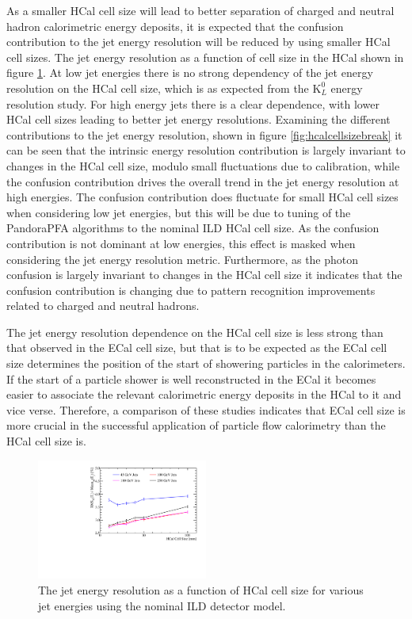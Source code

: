 As a smaller HCal cell size will lead to better separation of charged and neutral hadron calorimetric energy deposits, it is expected that the confusion contribution to the jet energy resolution will be reduced by using smaller HCal cell sizes.  The jet energy resolution as a function of cell size in the HCal shown in figure \ref{fig:hcalcellsize}.  At low jet energies there is no strong dependency of the jet energy resolution on the HCal cell size, which is as expected from the $\text{K}^{0}_{L}$ energy resolution study.  For high energy jets there is a clear dependence, with lower HCal cell sizes leading to better jet energy resolutions.  Examining the different contributions to the jet energy resolution, shown in figure \ref{fig:hcalcellsizebreak} it can be seen that the intrinsic energy resolution contribution is largely invariant to changes in the HCal cell size, modulo small fluctuations due to calibration, while the confusion contribution drives the overall trend in the jet energy resolution at high energies.  The confusion contribution does fluctuate for small HCal cell sizes when considering low jet energies, but this will be due to tuning of the PandoraPFA algorithms to the nominal ILD HCal cell size.  As the confusion contribution is not dominant at low energies, this effect is masked when considering the jet energy resolution metric.  Furthermore, as the photon confusion is largely invariant to changes in the HCal cell size it indicates that the confusion contribution is changing due to pattern recognition improvements related to charged and neutral hadrons.

The jet energy resolution dependence on the HCal cell size is less strong than that observed in the ECal cell size, but that is to be expected as the ECal cell size determines the position of the start of showering particles in the calorimeters.  If the start of a particle shower is well reconstructed in the ECal it becomes easier to associate the relevant calorimetric energy deposits in the HCal to it and vice verse.  Therefore, a comparison of these studies indicates that ECal cell size is more crucial in the successful application of particle flow calorimetry than the HCal cell size is.

\begin{figure}
\centering
\includegraphics[width=0.5\textwidth]{OptimisationStudies/Plots/JetEnergyResolutions/JER_vs_HCalCellSize.pdf}
\caption[The jet energy resolution as a function of HCal cell size for various jet energies using the nominal ILD detector model.]{The jet energy resolution as a function of HCal cell size for various jet energies using the nominal ILD detector model.}
\label{fig:hcalcellsize}
\end{figure}

